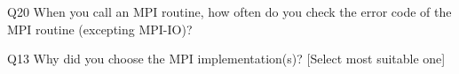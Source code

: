 \begin{description}%
\item{Q20} When you call an MPI routine, how often do you check the error code of the MPI routine  (excepting MPI-IO)?%
\item{Q13} Why did you choose the MPI implementation(s)? [Select most suitable one]%
\end{description}%
